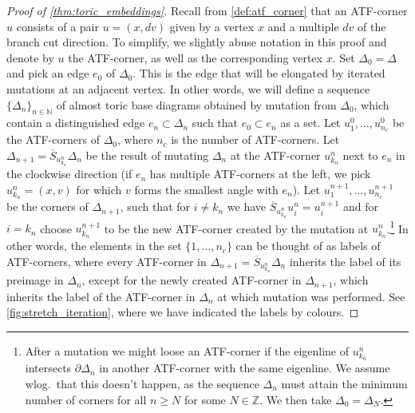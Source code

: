 \documentclass[12pt,a4paper,draft]{scrartcl}
\begin{document}
\begin{proof}[Proof of \cref{thm:toric_embeddings}]
    Recall from \cref{def:atf_corner} that an ATF-corner $u$ consists of a pair $u=(x,dv)$ given by a vertex $x$ and a multiple $dv$ of the branch cut direction. To simplify, we slightly abuse notation in this proof and denote by $u$ the ATF-corner, as well as the corresponding vertex $x$.
    Set $Δ_0 = Δ$ and pick an edge $e_0$ of $Δ_0$. This is the edge that will be elongated by iterated mutations at an adjacent vertex. In other words, we will define a sequence $\{\Delta_n\}_{n \in  \mathbb{N}}$ of almost toric base diagrams obtained by mutation from $\Delta_0$, which contain a distinguished edge $e_n \subset \Delta_n$ such that $e_0 \subset e_n$ as a set.
    Let $u_1^0,…,u_{n_c}^0$ be the ATF-corners of $Δ_0$, where $n_c$ is the number of ATF-corners. Let $Δ_{n+1} = \overline{S}_{u_{k_n}^n} Δ_n$ be the result of mutating $Δ_n$ at the ATF-corner $u_{k_n}^n$ next to $e_n$ in the clockwise direction (if $e_n$ has multiple ATF-corners at the left, we pick $u_{k_n}^n = (x,v)$ for which $v$ forms the smallest angle with $e_n$).
    Let $u_1^{n+1},…,u_{n_c}^{n+1}$ be the corners of $Δ_{n+1}$, such that for $i ≠ k_n$ we have $\overline{S}_{u_{k_n}^n} u_i^n = u_i^{n+1}$ and for $i=k_n$ choose $u_{k_n}^{n+1}$ to be the new ATF-corner created by the mutation at $u_{k_n}^n$.\footnote{After a mutation we might loose an ATF-corner if the eigenline of $u_{k_n}^n$ intersects $∂Δ_n$ in another ATF-corner with the same eigenline.
    We assume wlog.\ that this doesn't happen, as the sequence $Δ_n$ must attain the minimum number of corners for all $n ≥N$ for some $N ∈ ℤ$.
    We then take $Δ_0=Δ_N$.} In other words, the elements in the set $\{1,\ldots,n_c\}$ can be thought of as labels of ATF-corners, where every ATF-corner in $Δ_{n+1} = \overline{S}_{u_{k_n}^n} Δ_n$ inherits the label of its preimage in $\Delta_n$, except for the newly created ATF-corner in $\Delta_{n+1}$, which inherits the label of the ATF-corner in $\Delta_n$ at which mutation was performed. 
    See \cref{fig:stretch_iteration}, where we have indicated the labels by colours.


\end{proof}
\end{document}
